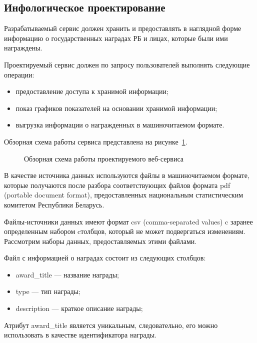 \pagebreak

\subsection{Инфологическое проектирование}
\label{ssub:db_info_stage}

Разрабатываемый сервис должен хранить и предоставлять в наглядной форме 
информацию о государственных наградах РБ и лицах, которые были ими награждены.

Проектируемый сервис должен по запросу пользователей выполнять следующие операции:
\begin{itemize}
\item
  предоставление доступа к хранимой информации;
\item
  показ графиков показателей на основании хранимой информации;
\item
  выгрузка информации о награжденных в машиночитаемом формате. 
\end{itemize}

Обзорная схема работы сервиса представлена на рисунке~\ref{fig:work_scheme}.

\begin{figure}[h!]
  \centering
  
  \caption{Обзорная схема работы проектируемого веб-сервиса}
  \label{fig:work_scheme}
\end{figure}

В качестве источника данных используются файлы в машиночитаемом формате,
которые получаются после разбора соответствующих файлов формата pdf
(portable document format),
предоставленных национальным статистическим комитетом Республики Беларусь.

Файлы-источники данных имеют формат csv (comma-separated values) c заранее определенным
набором cтолбцов, который не может подвергаться изменениям.
Рассмотрим наборы данных, предоставляемых этими файлами.

Файл с информацией о наградах состоит из следующих столбцов:
\begin{itemize}
\item
  award\_title --- название награды;
\item
  type --- тип награды;
\item
  description --- краткое описание награды;
\end{itemize}

Атрибут award\_title является уникальным, следовательно, его можно использовать
в качестве идентификатора награды.

